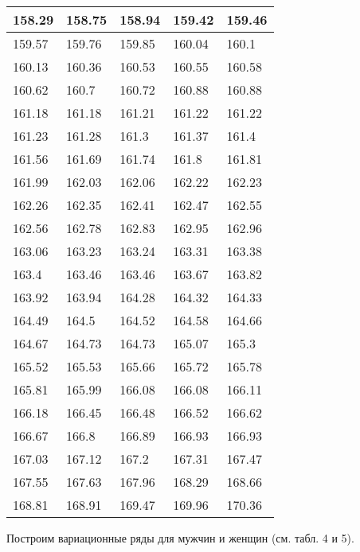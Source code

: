 \begin{longtable}{|p{2.5cm}|p{2.5cm}|p{2.5cm}|p{2.5cm}|p{2.5cm}|}
    \hline
    158.29 & 158.75 & 158.94 & 159.42 & 159.46 \\\hline
    159.57 & 159.76 & 159.85 & 160.04 & 160.1  \\\hline
    160.13 & 160.36 & 160.53 & 160.55 & 160.58 \\\hline
    160.62 & 160.7  & 160.72 & 160.88 & 160.88 \\\hline
    161.18 & 161.18 & 161.21 & 161.22 & 161.22 \\\hline
    161.23 & 161.28 & 161.3  & 161.37 & 161.4  \\\hline
    161.56 & 161.69 & 161.74 & 161.8  & 161.81 \\\hline
    161.99 & 162.03 & 162.06 & 162.22 & 162.23 \\\hline
    162.26 & 162.35 & 162.41 & 162.47 & 162.55 \\\hline
    162.56 & 162.78 & 162.83 & 162.95 & 162.96 \\\hline
    163.06 & 163.23 & 163.24 & 163.31 & 163.38 \\\hline
    163.4  & 163.46 & 163.46 & 163.67 & 163.82 \\\hline
    163.92 & 163.94 & 164.28 & 164.32 & 164.33 \\\hline
    164.49 & 164.5  & 164.52 & 164.58 & 164.66 \\\hline
    164.67 & 164.73 & 164.73 & 165.07 & 165.3  \\\hline
    165.52 & 165.53 & 165.66 & 165.72 & 165.78 \\\hline
    165.81 & 165.99 & 166.08 & 166.08 & 166.11 \\\hline
    166.18 & 166.45 & 166.48 & 166.52 & 166.62 \\\hline
    166.67 & 166.8  & 166.89 & 166.93 & 166.93 \\\hline
    167.03 & 167.12 & 167.2  & 167.31 & 167.47 \\\hline
    167.55 & 167.63 & 167.96 & 168.29 & 168.66 \\\hline
    168.81 & 168.91 & 169.47 & 169.96 & 170.36 \\\hline
\end{longtable}

Построим вариационные ряды для мужчин и женщин (см. табл. 4 и 5).

\pagebreak

